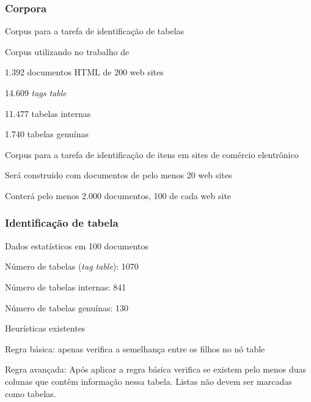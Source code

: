 \documentclass{beamer}
\newenvironment{my_itemize}{
\begin{itemize}
  \setlength{\itemsep}{5pt}
  \setlength{\parskip}{2pt}
  \setlength{\parsep}{3pt}
}{\end{itemize}}
\begin{document}
\begin{frame}
\frametitle{Corpora}
  \begin{my_itemize}
    \item Corpus para a tarefa de identificação de tabelas
    \begin{my_itemize}
      \item Corpus utilizando no trabalho de ~\cite{Wang2002}
      \item 1.392 documentos HTML de 200 web sites
      \item 14.609 \it{tags table}
      \item 11.477 tabelas internas
      \item 1.740 tabelas genuínas
    \end{my_itemize}
\pause

    \item Corpus para a tarefa de identificação de itens em sites de
    comércio elentrônico
    \begin{my_itemize}
      \item Será construido com documentos de pelo menos 20 web sites
      \item Conterá pelo menos 2.000 documentos, 100 de cada web site
    \end{my_itemize}
    
  \end{my_itemize}

\end{frame}


\begin{frame}
  \frametitle{Identificação de tabela}
  \begin{my_itemize}
   \item Dados estatísticos em 100 documentos
   \begin{my_itemize}
   \item Número de tabelas (\textit{tag table}): 1070
   \item Número de tabelas internas: 841 
   \item Número de tabelas genuínas: 130
   \end{my_itemize}

\pause
   \item Heurísticas existentes
   \begin{my_itemize}
   \item Regra básica: apenas verifica a semelhança entre os filhos no nó table
   \item Regra avançada: Após aplicar a regra básica verifica se
   existem pelo menos duas colunas que contêm informação nessa tabela.
   Listas não devem ser marcadas como tabelas.

   \end{my_itemize}
  \end{my_itemize}
\end{frame}
\end{document}
